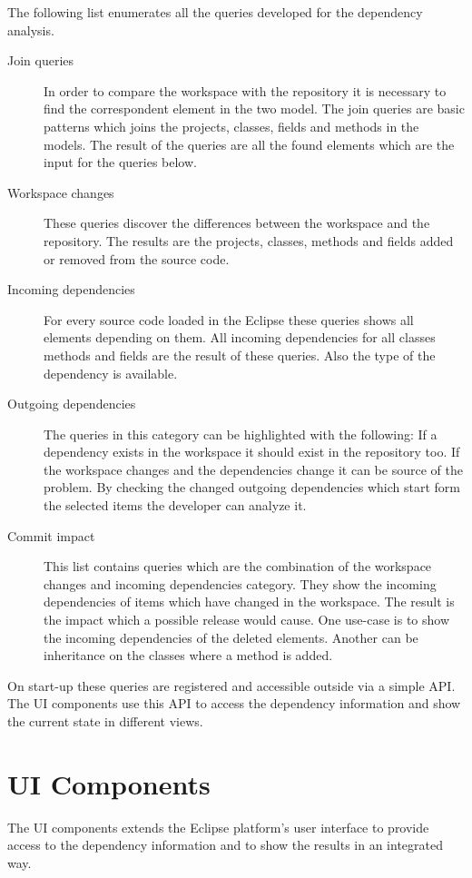 The following list enumerates all the  queries developed for the dependency
analysis.
\begin{description}	
\item[Join queries]
In order to compare the workspace with the repository it is necessary to find 
the correspondent element in the two model. The join queries are basic patterns 
which joins the projects, classes, fields and methods in the models. The result
of the queries are all the found elements which are the input for the queries 
below. 
\item[Workspace changes] These queries discover the differences between the 
workspace and the repository. The results are the projects, classes, methods
and fields added or removed from the source code.   
\item[Incoming dependencies] For every source code loaded in the Eclipse these
queries shows all elements depending  on them. All incoming dependencies for 
all classes methods and fields are the result of these queries. Also the type
of the dependency is available. 
\item[Outgoing dependencies] The queries in this category can be highlighted 
with the following: If a dependency exists in the workspace it should
exist in the repository too. If the workspace changes and the dependencies change
it can be source of the problem.  By checking the changed outgoing dependencies
which start form the selected items the developer can analyze it.
\item[Commit impact] This list contains queries which are the combination of 
the workspace changes and incoming dependencies category. They show the incoming
dependencies of items which have changed in the workspace. The result is the
impact which a possible release would cause.  One use-case is to show the
incoming dependencies of the deleted elements. Another can be inheritance on
the classes where a method is added.
\end{description}

On start-up these queries are registered and accessible outside via a simple API.
The UI components use this API to access the dependency information and show the
current state in different views.

\section{UI Components}
The UI components extends the Eclipse platform's user interface to provide
access to the dependency information and to show the results in an integrated
way. 
 
